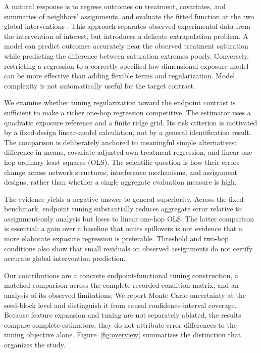 \documentclass{article}
\begin{document}
A natural response is to regress outcomes on treatment, covariates, and summaries of neighbors' assignments, and evaluate the fitted function at the two global interventions \citep{Chin2019}. This approach separates observed experimental data from the intervention of interest, but introduces a delicate extrapolation problem. A model can predict outcomes accurately near the observed treatment saturation while predicting the difference between saturation extremes poorly. Conversely, restricting a regression to a correctly specified low-dimensional exposure model can be more effective than adding flexible terms and regularization. Model complexity is not automatically useful for the target contrast.

We examine whether tuning regularization toward the endpoint contrast is sufficient to make a richer one-hop regression competitive. The estimator uses a quadratic exposure reference and a finite ridge grid. Its risk criterion is motivated by a fixed-design linear-model calculation, not by a general identification result. The comparison is deliberately anchored to meaningful simple alternatives: difference in means, covariate-adjusted own-treatment regression, and linear one-hop ordinary least squares (OLS). The scientific question is how their errors change across network structures, interference mechanisms, and assignment designs, rather than whether a single aggregate evaluation measure is high.

The evidence yields a negative answer to general superiority. Across the fixed benchmark, endpoint tuning substantially reduces aggregate error relative to assignment-only analysis but loses to linear one-hop OLS. The latter comparison is essential: a gain over a baseline that omits spillovers is not evidence that a more elaborate exposure regression is preferable. Threshold and two-hop conditions also show that small residuals on observed assignments do not certify accurate global intervention prediction.

Our contributions are a concrete endpoint-functional tuning construction, a matched comparison across the complete recorded condition matrix, and an analysis of its observed limitations. We report Monte Carlo uncertainty at the seed-block level and distinguish it from causal confidence-interval coverage. Because feature expansion and tuning are not separately ablated, the results compare complete estimators; they do not attribute error differences to the tuning objective alone. Figure~\ref{fig:overview} summarizes the distinction that organizes the study.
\end{document}
